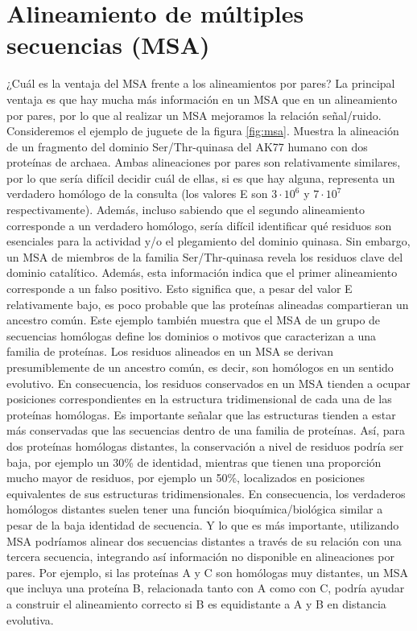 \chapter{Alineamiento de múltiples secuencias (MSA)}
¿Cuál es la ventaja del MSA frente a los alineamientos por pares? La principal ventaja es que hay mucha más información en un MSA que en un alineamiento por pares, por lo que al realizar un MSA mejoramos la relación señal/ruido. Consideremos el ejemplo de juguete de la figura \ref{fig:msa}. Muestra la alineación de un fragmento del dominio Ser/Thr-quinasa del AK77 humano con dos proteínas de archaea. Ambas alineaciones por pares son relativamente similares, por lo que sería difícil decidir cuál de ellas, si es que hay alguna, representa un verdadero homólogo de la consulta (los valores E son $3 \cdot 10^6$ y $7 \cdot 10^7$ respectivamente). Además, incluso sabiendo que el segundo alineamiento corresponde a un verdadero homólogo, sería difícil identificar qué residuos son esenciales para la actividad y/o el plegamiento del dominio quinasa. Sin embargo, un MSA de miembros de la familia Ser/Thr-quinasa revela los residuos clave del dominio catalítico. Además, esta información indica que el primer alineamiento corresponde a un falso positivo. Esto significa que, a pesar del valor E relativamente bajo, es poco probable que las proteínas alineadas compartieran un ancestro común. Este ejemplo también muestra que el MSA de un grupo de secuencias homólogas define los dominios o motivos que caracterizan a una familia de proteínas. Los residuos alineados en un MSA se derivan presumiblemente de un ancestro común, es decir, son homólogos en un sentido evolutivo. En consecuencia, los residuos conservados en un MSA tienden a ocupar posiciones correspondientes en la estructura tridimensional de cada una de las proteínas homólogas. Es importante señalar que las estructuras tienden a estar más conservadas que las secuencias dentro de una familia de proteínas. Así, para dos proteínas homólogas distantes, la conservación a nivel de residuos podría ser baja, por ejemplo un 30\% de identidad, mientras que tienen una proporción mucho mayor de residuos, por ejemplo un 50\%, localizados en posiciones equivalentes de sus estructuras tridimensionales. En consecuencia, los verdaderos homólogos distantes suelen tener una función bioquímica/biológica similar a pesar de la baja identidad de secuencia. Y lo que es más importante, utilizando MSA podríamos alinear dos secuencias distantes a través de su relación con una tercera secuencia, integrando así información no disponible en alineaciones por pares. Por ejemplo, si las proteínas A y C son homólogas muy distantes, un MSA que incluya una proteína B, relacionada tanto con A como con C, podría ayudar a construir el alineamiento correcto si B es equidistante a A y B en distancia evolutiva.

